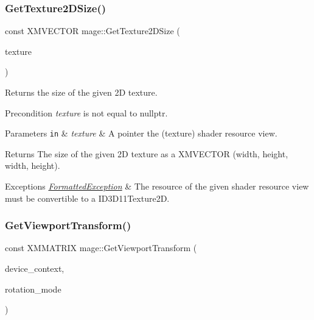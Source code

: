 \hypertarget{namespacemage_a32e962380f439a26629371c492643616}{}\label{namespacemage_a32e962380f439a26629371c492643616} 
\subsubsection{\texorpdfstring{Get\+Texture2\+D\+Size()}{GetTexture2DSize()}}
{\footnotesize\ttfamily const X\+M\+V\+E\+C\+T\+OR mage\+::\+Get\+Texture2\+D\+Size (\begin{DoxyParamCaption}\item[{I\+D3\+D11\+Shader\+Resource\+View $\ast$}]{texture }\end{DoxyParamCaption})}

Returns the size of the given 2D texture.

\begin{DoxyPrecond}{Precondition}
{\itshape texture} is not equal to {\ttfamily nullptr}. 
\end{DoxyPrecond}

\begin{DoxyParams}[1]{Parameters}
\mbox{\tt in}  & {\em texture} & A pointer the (texture) shader resource view. \\
\hline
\end{DoxyParams}
\begin{DoxyReturn}{Returns}
The size of the given 2D texture as a {\ttfamily X\+M\+V\+E\+C\+T\+OR} (width, height, width, height). 
\end{DoxyReturn}

\begin{DoxyExceptions}{Exceptions}
{\em \hyperlink{structmage_1_1_formatted_exception}{Formatted\+Exception}} & The resource of the given shader resource view must be convertible to a {\ttfamily I\+D3\+D11\+Texture2D}. \\
\hline
\end{DoxyExceptions}
\hypertarget{namespacemage_a706e1b2866209b405f52e62c521f4884}{}\label{namespacemage_a706e1b2866209b405f52e62c521f4884} 
\subsubsection{\texorpdfstring{Get\+Viewport\+Transform()}{GetViewportTransform()}\hspace{0.1cm}{\footnotesize\ttfamily [1/3]}}
{\footnotesize\ttfamily const X\+M\+M\+A\+T\+R\+IX mage\+::\+Get\+Viewport\+Transform (\begin{DoxyParamCaption}\item[{I\+D3\+D11\+Device\+Context $\ast$}]{device\+\_\+context,  }\item[{D\+X\+G\+I\+\_\+\+M\+O\+D\+E\+\_\+\+R\+O\+T\+A\+T\+I\+ON}]{rotation\+\_\+mode }\end{DoxyParamCaption})}

